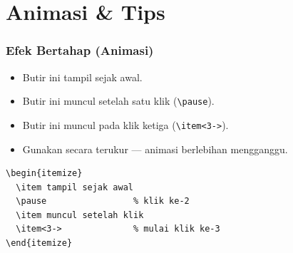 \section{Animasi \& Tips}

\begin{frame}[fragile]
  \frametitle{Efek Bertahap (Animasi)}

  \begin{itemize}
    \item Butir ini tampil sejak awal.
    \pause
    \item Butir ini muncul setelah satu klik (\texttt{\textbackslash pause}).
    \item<3-> Butir ini muncul pada klik ketiga (\texttt{\textbackslash item<3->}).
    \item<4-> Gunakan secara terukur --- animasi berlebihan mengganggu.
  \end{itemize}

  \medskip
  \begin{lstlisting}
\begin{itemize}
  \item tampil sejak awal
  \pause                 % klik ke-2
  \item muncul setelah klik
  \item<3->              % mulai klik ke-3
\end{itemize}
  \end{lstlisting}
\end{frame}

